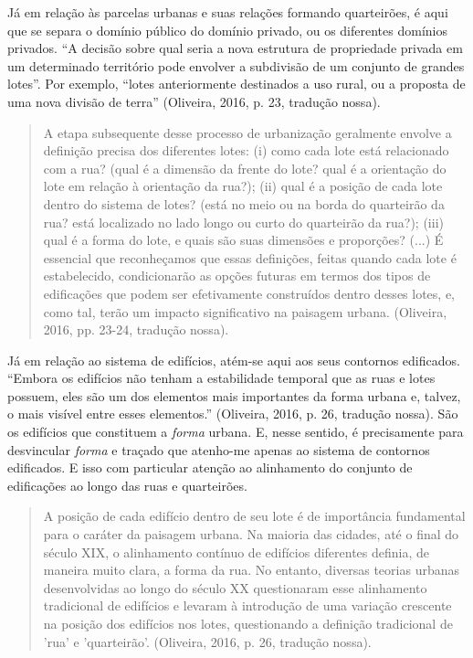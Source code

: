 \documentclass[12pt, a4paper]{book} %
\begin{document}
        Já em relação às parcelas urbanas e suas relações formando quarteirões, é aqui que se separa o domínio público do domínio privado, ou os diferentes domínios privados. ``A decisão sobre qual seria a nova estrutura de propriedade privada em um determinado território pode envolver a subdivisão de um conjunto de grandes lotes''. Por exemplo, ``lotes anteriormente destinados a uso rural, ou a proposta de uma nova divisão de terra'' (Oliveira, 2016, p. 23, tradução nossa).

        \begin{quotation}
            A etapa subsequente desse processo de urbanização geralmente envolve a definição precisa dos diferentes lotes: (i) como cada lote está relacionado com a rua? (qual é a dimensão da frente do lote? qual é a orientação do lote em relação à orientação da rua?); (ii) qual é a posição de cada lote dentro do sistema de lotes? (está no meio ou na borda do quarteirão da rua? está localizado no lado longo ou curto do quarteirão da rua?); (iii) qual é a forma do lote, e quais são suas dimensões e proporções? (...) É essencial que reconheçamos que essas definições, feitas quando cada lote é estabelecido, condicionarão as opções futuras em termos dos tipos de edificações que podem ser efetivamente construídos dentro desses lotes, e, como tal, terão um impacto significativo na paisagem urbana. (Oliveira, 2016, pp. 23-24, tradução nossa).
        \end{quotation}

        Já em relação ao sistema de edifícios, atém-se aqui aos seus contornos edificados. ``Embora os edifícios não tenham a estabilidade temporal que as ruas e lotes possuem, eles são um dos elementos mais importantes da forma urbana e, talvez, o mais visível entre esses elementos.'' (Oliveira, 2016, p. 26, tradução nossa). São os edifícios que constituem a \textit{forma} urbana. E, nesse sentido, é precisamente para desvincular \textit{forma} e traçado que atenho-me apenas ao sistema de contornos edificados. E isso com particular atenção ao alinhamento do conjunto de edificações ao longo das ruas e quarteirões.

        \begin{quotation}
            A posição de cada edifício dentro de seu lote é de importância fundamental para o caráter da paisagem urbana. Na maioria das cidades, até o final do século XIX, o alinhamento contínuo de edifícios diferentes definia, de maneira muito clara, a forma da rua. No entanto, diversas teorias urbanas desenvolvidas ao longo do século XX questionaram esse alinhamento tradicional de edifícios e levaram à introdução de uma variação crescente na posição dos edifícios nos lotes, questionando a definição tradicional de 'rua' e 'quarteirão'. (Oliveira, 2016, p. 26, tradução nossa).
        \end{quotation}
\end{document}
